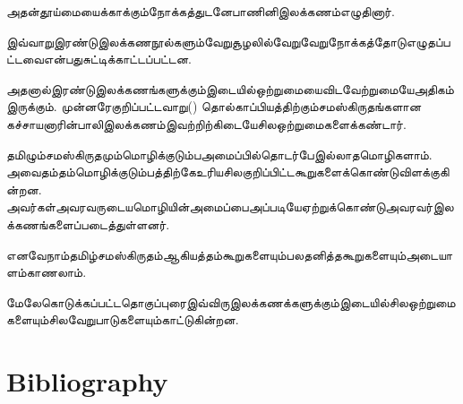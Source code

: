 அதன்தூய்மையைக்காக்கும்நோக்கத்துடனேபாணினிஇலக்கணம்எழுதினார்.

இவ்வாறுஇரண்டுஇலக்கணநூல்களும்வேறுசூழலில்வேறுவேறுநோக்கத்தோடுஎழுதப்பட்டவைஎன்பதுசுட்டிக்காட்டப்பட்டன.

அதனால்இரண்டுஇலக்கணங்களுக்கும்இடையில்ஒற்றுமையைவிடவேற்றுமையேஅதிகம்இருக்கும். முன்னரேகுறிப்பட்டவாறு() தொல்காப்பியத்திற்கும்சமஸ்கிருதங்களான  கச்சாயனாரின்பாலிஇலக்கணம்இவற்றிற்கிடையேசிலஒற்றுமைகளைக்கண்டார்.

தமிழும்சமஸ்கிருதமும்மொழிக்குடும்பஅமைப்பில்தொடர்பேஇல்லாதமொழிகளாம். அவைதம்தம்மொழிக்குடும்பத்திற்கேஉரியசிலகுறிப்பிட்டகூறுகளைக்கொண்டுவிளக்குகின்றன. அவர்கள்அவரவருடையமொழியின்அமைப்பைஅப்படியேஏற்றுக்கொண்டுஅவரவர்இலக்கணங்களைப்படைத்துள்ளனர். 

எனவேநாம்தமிழ்சமஸ்கிருதம்ஆகியத்தம்கூறுகளையும்பலதனித்தகூறுகளையும்அடையாளம்காணலாம். 

மேலேகொடுக்கப்பட்டதொகுப்புரைஇவ்விருஇலக்கணக்களுக்கும்இடையில்சிலஒற்றுமைகளையும்சிலவேறுபாடுகளையும்காட்டுகின்றன.


\section*{Bibliography}

